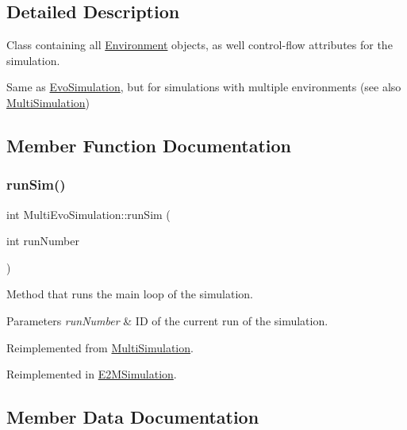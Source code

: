 \subsection{Detailed Description}
Class containing all \hyperlink{classEnvironment}{Environment} objects, as well control-\/flow attributes for the simulation. 

Same as \hyperlink{classEvoSimulation}{Evo\+Simulation}, but for simulations with multiple environments (see also \hyperlink{classMultiSimulation}{Multi\+Simulation}) 

\subsection{Member Function Documentation}
\hypertarget{classMultiEvoSimulation_a89c9806ac998c06230cdd41cc6a532bf}{}\label{classMultiEvoSimulation_a89c9806ac998c06230cdd41cc6a532bf} 
\subsubsection{\texorpdfstring{run\+Sim()}{runSim()}}
{\footnotesize\ttfamily int Multi\+Evo\+Simulation\+::run\+Sim (\begin{DoxyParamCaption}\item[{int}]{run\+Number }\end{DoxyParamCaption})\hspace{0.3cm}{\ttfamily [virtual]}}



Method that runs the main loop of the simulation. 


\begin{DoxyParams}{Parameters}
{\em run\+Number} & ID of the current run of the simulation. \\
\hline
\end{DoxyParams}


Reimplemented from \hyperlink{classMultiSimulation_a235347d04fd0c7e1a2e35d7a39e77583}{Multi\+Simulation}.



Reimplemented in \hyperlink{classE2MSimulation_aeac4e92c10f89a5c953ace5b1327d20b}{E2\+M\+Simulation}.



\subsection{Member Data Documentation}
\hypertarget{classMultiEvoSimulation_ac9389b3f03afb6195da67337cd1f1957}{}\label{classMultiEvoSimulation_ac9389b3f03afb6195da67337cd1f1957} 
